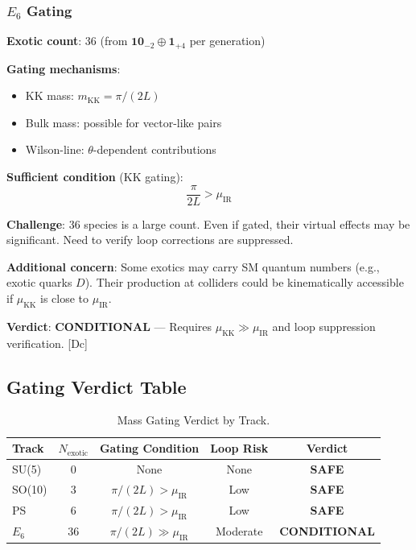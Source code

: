 \documentclass[11pt,a4paper]{article}
\newcommand{\tagDc}{\textcolor{blue!50!black}{[Dc]}}
\begin{document}
\subsubsection{$E_6$ Gating}

\begin{verdictbox}
\textbf{Exotic count}: 36 (from $\mathbf{10}_{-2} \oplus \mathbf{1}_{+4}$ per generation)

\textbf{Gating mechanisms}:
\begin{itemize}
    \item KK mass: $m_{\text{KK}} = \pi/(2L)$
    \item Bulk mass: possible for vector-like pairs
    \item Wilson-line: $\theta$-dependent contributions
\end{itemize}

\textbf{Sufficient condition} (KK gating):
\begin{equation}
\label{eq:e6-gate}
\frac{\pi}{2L} > \mu_{\text{IR}}
\end{equation}

\textbf{Challenge}: 36 species is a large count. Even if gated, their virtual effects
may be significant. Need to verify loop corrections are suppressed.

\textbf{Additional concern}: Some exotics may carry SM quantum numbers (e.g., exotic quarks $D$).
Their production at colliders could be kinematically accessible if $\mu_{\text{KK}}$ is
close to $\mu_{\text{IR}}$.

\textbf{Verdict}: \textcolor{orange!70!black}{\textbf{CONDITIONAL}} --- Requires $\mu_{\text{KK}} \gg \mu_{\text{IR}}$
and loop suppression verification.
\tagDc
\end{verdictbox}

\subsection{Gating Verdict Table}

\begin{table}[h]
\centering
\caption{Mass Gating Verdict by Track.}
\label{tab:gating-verdict}
\begin{tabular}{lcccc}
\toprule
Track & $N_{\text{exotic}}$ & Gating Condition & Loop Risk & \textbf{Verdict} \\
\midrule
SU(5) & 0 & None & None & \textcolor{green!60!black}{\textbf{SAFE}} \\
SO(10) & 3 & $\pi/(2L) > \mu_{\text{IR}}$ & Low & \textcolor{green!60!black}{\textbf{SAFE}} \\
PS & 6 & $\pi/(2L) > \mu_{\text{IR}}$ & Low & \textcolor{green!60!black}{\textbf{SAFE}} \\
$E_6$ & 36 & $\pi/(2L) \gg \mu_{\text{IR}}$ & Moderate & \textcolor{orange!70!black}{\textbf{CONDITIONAL}} \\
\bottomrule
\end{tabular}
\end{table}
\end{document}
